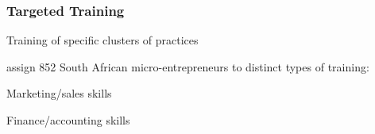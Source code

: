 \documentclass[hideothersubsections, usenames,dvipsnames,11pt]{beamer}
\newenvironment{itemize_2pt}{\itemize\addtolength{\itemsep}{2pt}}{\enditemize}
\newenvironment{enumerate_2pt}{\enumerate\addtolength{\itemsep}{2pt}}{\endenumerate}
\begin{document}
\begin{frame}
\frametitle{Targeted Training}

Training of specific clusters of practices
\begin{itemize_2pt}	
	\item \citet{Anderson2018} assign 852 South African micro-entrepreneurs to distinct types of training:
	
	\vspace{0.5em}	
	
	\begin{enumerate_2pt}
		\item Marketing/sales skills
		\item[]
		\item[]
		\item[]
		\item Finance/accounting skills
		\item[]
		\item[]
		\item[]
	\end{enumerate_2pt}
\end{itemize_2pt}

\end{frame}
\end{document}
